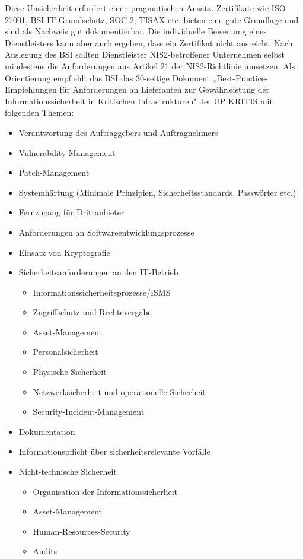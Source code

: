 Diese Unsicherheit erfordert einen pragmatischen Ansatz. Zertifikate wie ISO 27001, BSI IT-Grundschutz, SOC 2, TISAX etc. bieten eine gute Grundlage und sind als Nachweis gut dokumentierbar. Die individuelle Bewertung eines Dienstleisters kann aber auch ergeben, dass ein Zertifikat nicht ausreicht.
\newpage
Nach Auslegung des BSI sollten Dienstleister NIS2-betroffener Unternehmen selbst mindestens die Anforderungen aus Artikel 21 der NIS2-Richtlinie umsetzen. Als Orientierung empfiehlt das BSI das 30-seitige Dokument „Best-Practice-Empfehlungen für Anforderungen an Lieferanten zur Gewährleistung der Informationssicherheit in Kritischen Infrastrukturen" der UP KRITIS mit folgenden Themen:
\begin{itemize}
    \item Verantwortung des Auftraggebers und Auftragnehmers
    \item Vulnerability-Management
    \item Patch-Management
    \item Systemhärtung (Minimale Prinzipien, Sicherheitsstandards, Passwörter etc.)
    \item Fernzugang für Drittanbieter
    \item Anforderungen an Softwareentwicklungsprozesse
    \item Einsatz von Kryptografie
    \item Sicherheitsanforderungen an den IT-Betrieb
    \begin{itemize}
        \item Informationssicherheitsprozesse/ISMS
        \item Zugriffschutz und Rechtevergabe
        \item Asset-Management
        \item Personalsicherheit
        \item Physische Sicherheit
        \item Netzwerksicherheit und operationelle Sicherheit
        \item Security-Incident-Management
    \end{itemize}
    \item Dokumentation
    \item Informationspflicht über sicherheitsrelevante Vorfälle
    \item Nicht-technische Sicherheit
    \begin{itemize}
        \item Organisation der Informationssicherheit
        \item Asset-Management
        \item Human-Resources-Security
        \item Audits
    \end{itemize}
\end{itemize}


